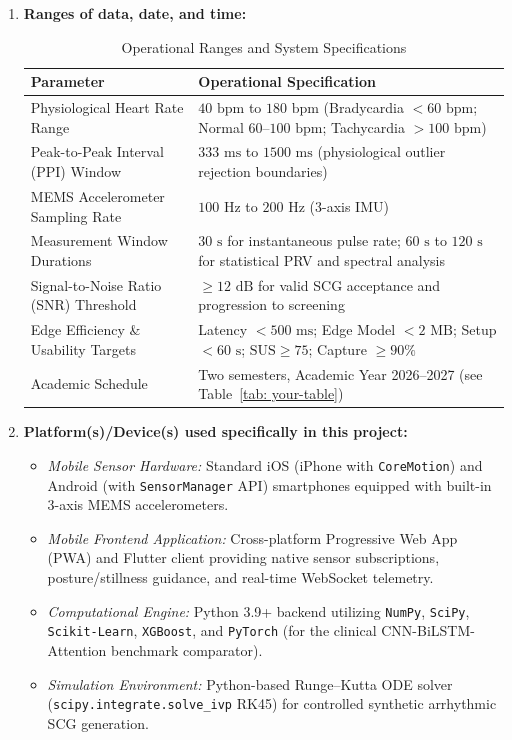 \begin{enumerate}
	\item \textbf{Ranges of data, date, and time:}
	\begin{table}[!ht]
		\footnotesize
		\centering
		\caption{Operational Ranges and System Specifications}
		\label{tab:system_ranges}
		\begin{tabular}{|p{4.2cm}|p{8.8cm}|}
			\hline
			\textbf{Parameter} & \textbf{Operational Specification} \\ \hline
			Physiological Heart Rate Range & $40\text{ bpm}$ to $180\text{ bpm}$ (Bradycardia $<60\text{ bpm}$; Normal $60\text{--}100\text{ bpm}$; Tachycardia $>100\text{ bpm}$) \\ \hline
			Peak-to-Peak Interval (PPI) Window & $333\text{ ms}$ to $1500\text{ ms}$ (physiological outlier rejection boundaries) \\ \hline
			MEMS Accelerometer Sampling Rate & $100\text{ Hz}$ to $200\text{ Hz}$ (3-axis IMU) \\ \hline
			Measurement Window Durations & $30\text{ s}$ for instantaneous pulse rate; $60\text{ s}$ to $120\text{ s}$ for statistical PRV and spectral analysis \\ \hline
			Signal-to-Noise Ratio (SNR) Threshold & $\ge 12\text{ dB}$ for valid SCG acceptance and progression to screening \\ \hline
			Edge Efficiency \& Usability Targets & Latency $< 500\text{ ms}$; Edge Model $< 2\text{ MB}$; Setup $< 60\text{ s}$; $\text{SUS} \ge 75$; Capture $\ge 90\%$ \\ \hline
			Academic Schedule & Two semesters, Academic Year 2026--2027 (see Table~\ref{tab: your-table}) \\ \hline
		\end{tabular}
	\end{table}
	
	\item \textbf{Platform(s)/Device(s) used specifically in this project:}
	\begin{itemize}
		\item \textit{Mobile Sensor Hardware:} Standard iOS (iPhone with \texttt{CoreMotion}) and Android (with \texttt{SensorManager} API) smartphones equipped with built-in 3-axis MEMS accelerometers.
		\item \textit{Mobile Frontend Application:} Cross-platform Progressive Web App (PWA) and Flutter client providing native sensor subscriptions, posture/stillness guidance, and real-time WebSocket telemetry.
		\item \textit{Computational Engine:} Python 3.9+ backend utilizing \texttt{NumPy}, \texttt{SciPy}, \texttt{Scikit-Learn}, \texttt{XGBoost}, and \texttt{PyTorch} (for the clinical CNN-BiLSTM-Attention benchmark comparator).
		\item \textit{Simulation Environment:} Python-based Runge--Kutta ODE solver (\texttt{scipy.integrate.solve\_ivp} RK45) for controlled synthetic arrhythmic SCG generation.
	\end{itemize}
\end{enumerate}

